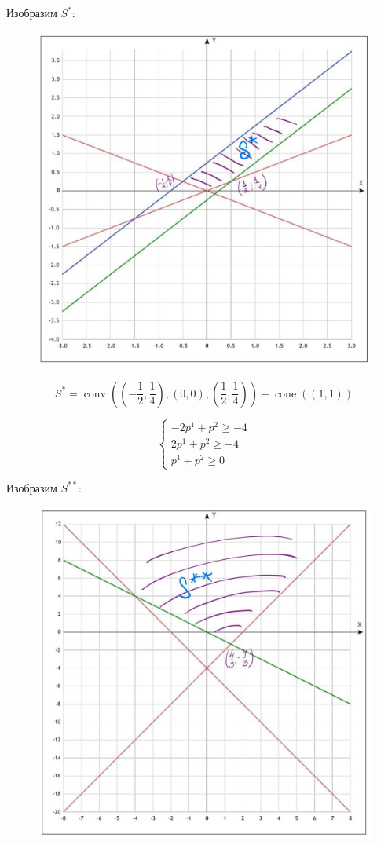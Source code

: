 \documentclass[12pt,letterpaper]{article}
\begin{document}
Изобразим $ S^* $:
\begin{figure}[h!]
\begin{minipage}[h]{1\linewidth}
\begin{center}
\includegraphics[width=0.6\linewidth]{S2}
\end{center}
\end{minipage}
\end{figure}
 
$$
S^*=\operatorname{conv}\left(\left(-\frac{1}{2}, \frac{1}{4} \right), \left( 0,0 \right),  \left( \frac{1}{2}, \frac{1}{4} \right) \right)+\operatorname{cone}\left((1,1) \right)
$$

\newpage
$$
\left\{\begin{array}{l}
-2 p^{1}+p^{2} \geq-4 \\
2 p^{1}+p^{2} \geq-4 \\
p^{1}+p^{2} \geq 0
\end{array}\right.
$$

Изобразим $ S^{**} $:
\begin{figure}[h!]
\begin{minipage}[h]{1\linewidth}
\begin{center}
\includegraphics[width=0.6\linewidth]{S3}
\end{center}
\end{minipage}
\end{figure}
\end{document}
